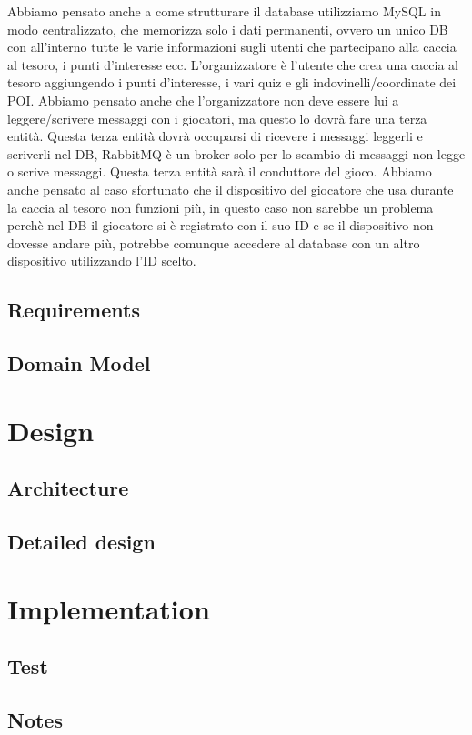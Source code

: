 \documentclass[12pt, english]{report}
\begin{document}
Abbiamo pensato anche a come strutturare il database utilizziamo MySQL in modo centralizzato, che memorizza solo i dati permanenti, ovvero un unico DB con all'interno tutte le varie informazioni sugli utenti che partecipano alla caccia al tesoro, i punti d'interesse ecc. L'organizzatore è l'utente che crea una caccia al tesoro aggiungendo i punti d'interesse, i vari quiz e gli indovinelli/coordinate dei POI. Abbiamo pensato anche che l'organizzatore non deve essere lui a leggere/scrivere messaggi con i giocatori, ma questo lo dovrà fare una terza entità. Questa terza entità dovrà occuparsi di ricevere i messaggi leggerli e scriverli nel DB, RabbitMQ è un broker solo per lo scambio di messaggi non legge o scrive messaggi. Questa terza entità  sarà il conduttore del gioco. Abbiamo anche pensato al caso sfortunato che il dispositivo del giocatore che usa durante la caccia al tesoro non funzioni più, in questo caso non sarebbe un problema perchè nel DB il giocatore si è registrato con il suo ID e se il dispositivo non dovesse andare più, potrebbe comunque accedere al database con un altro dispositivo utilizzando l'ID scelto.



\subsection{Requirements}
\subsection{Domain Model}

\section{Design}
\subsection{Architecture}
\subsection{Detailed design}
\section{Implementation}
\subsection{Test}
\subsection{Notes}
\end{document}
